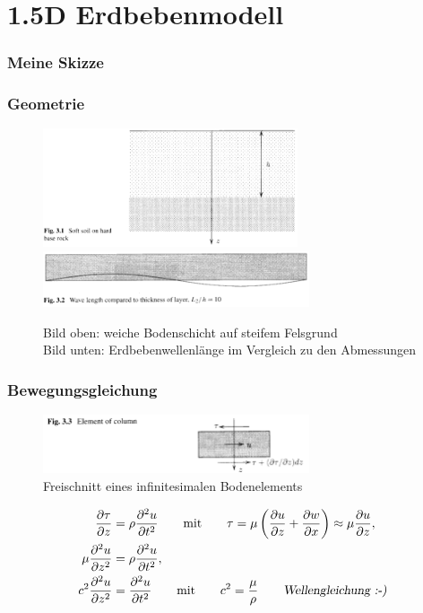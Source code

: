 \documentclass[hyperref={pdfpagemode=FullScreen, colorlinks=false}]{beamer}
\begin{document}
\section{1.5D Erdbebenmodell}

\begin{frame}
\frametitle{Meine Skizze}


\end{frame}

\begin{frame}
\frametitle{Geometrie}

\begin{figure}
\includegraphics[width=0.67\textwidth]{fig_img/earthquake_model.pdf}
\includegraphics[width=0.7\textwidth]{fig_img/earthquake_length_ratio.pdf}
\caption*{Bild oben: weiche Bodenschicht auf steifem Felsgrund\\ Bild unten: Erdbebenwellenlänge im Vergleich zu den Abmessungen \cite{Verruijt2010}}
\end{figure}
\end{frame}

\begin{frame}
\frametitle{Bewegungsgleichung}
\begin{figure}
\includegraphics[width=0.7\textwidth]{fig_img/earthquake_inf_element.pdf}
\caption*{Freischnitt eines infinitesimalen Bodenelements \cite{Verruijt2010}}
\end{figure}
\begin{align*}
 \frac{\partial \tau}{\partial z} &= \rho \frac{\partial^2 u}{\partial t^2}
 \qquad \text{mit} \qquad \tau=\mu \left(\frac{\partial u}{\partial z} +  \frac{\partial w}{\partial x} \right)\approx \mu \frac{\partial u}{\partial z},\\
 \mu \frac{\partial^2 u}{\partial z^2} &= \rho \frac{\partial^2 u}{\partial t^2},\\
 c^2\frac{\partial^2 u}{\partial z^2} &= \frac{\partial^2 u}{\partial t^2}
 \qquad \text{mit} \qquad c^2=\frac{\mu}{\rho}  \qquad \text{\textsl{Wellengleichung :-)}}
\end{align*}
\end{frame}
\end{document}
